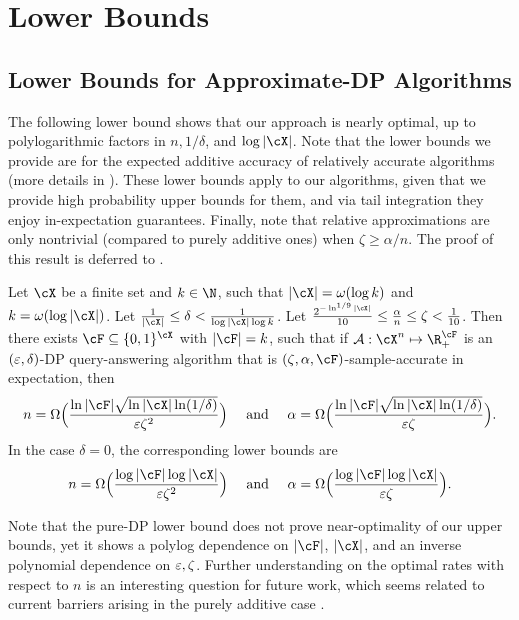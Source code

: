 \section{Lower Bounds}

\label{sec:lower-bounds}

\subsection{Lower Bounds for Approximate-DP Algorithms}

The following lower bound shows that our approach is nearly optimal, up to polylogarithmic factors in $n,1/\delta$, and $\log |\cX|$. Note that the lower bounds we provide are for the expected additive accuracy of relatively accurate algorithms (more details in ). These lower bounds apply to our algorithms, given that we provide high probability upper bounds for them, and via tail integration they enjoy in-expectation guarantees. Finally,
note that relative approximations are only nontrivial (compared to purely additive ones) when $\zeta\geq \alpha/n$. The proof of this result is deferred to .
\begin{theorem}  \label{thm:approx_DP_LB}
Let ${\cX}$ be a finite set and $k\in \N$, such that  
$|{\cX}| = \omega(\log k)$ and $k = \omega(\log|{\cX}|)$. 
Let $\frac{1}{|\cX|}\leq \delta<\frac{1}{\log|\cX|\log k}$. 
Let $\frac{2^{-\ln^{1/9}|{\cX}|}}{10}\leq  \frac{\alpha}{n} \leq \zeta<\frac{1}{10}$. Then there exists $\cF\subseteq\{0,1\}^{\cX}$ with $|\cF|=k$, such that if
${\cal A}:{\cX}^n\mapsto\R_+^{\cF}$ is an $(\varepsilon,\delta)$-DP query-answering algorithm that is $(\zeta,\alpha,\cF)$-sample-accurate in expectation, then
\begin{align} 
n = \Omega\Big(\frac{\ln|{\cF}|\sqrt{\ln|{\cX}| \ln(1/\delta)}}{\eps \zeta^2}\Big) \quad \mbox{ and }\quad  
\alpha = \Omega\Big(\frac{\ln|{\cF}|\sqrt{\ln|{\cX}| \ln(1/\delta)}}{\eps \zeta}\Big). \label{eqn:LB_approx_DP}
\end{align}
In the case $\delta=0$, the corresponding lower bounds are
\[ n = \Omega\Big( \frac{\log|{\cF}| \log|\cX|}{\eps \zeta^2} \Big) \quad\mbox{ and }\quad  \alpha = \Omega\Big( \frac{\log|{\cF}| \log|\cX|}{\eps \zeta} \Big). \]
\end{theorem}



Note that the pure-DP lower bound does not prove near-optimality of our upper bounds, yet it shows a polylog dependence on $|{\cF}|$, $|\cX|$, and an inverse polynomial dependence on $\varepsilon,\zeta$. Further understanding on the optimal rates with respect to $n$ is an interesting question for future work, which seems related to current barriers arising in the purely additive case \citep{DPorg-open-problem-optimal-query-release}. 
